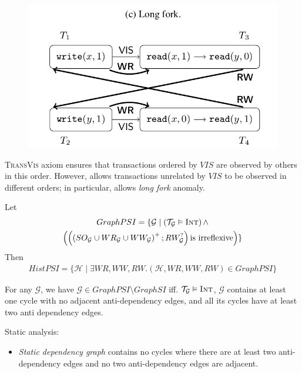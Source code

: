 \documentclass{beamer}
\begin{document}
\begin{frame}
	\begin{figure}
		\includegraphics[scale=0.25]{fig2c}
	\end{figure}
	\begin{definition}
		\textsc{TransVis} axiom ensures that transactions ordered by $VIS$ are observed by others in this order. However, allows transactions unrelated by $VIS$ to be observed in different orders; in particular, allows \textit{long fork} anomaly. \\
	\end{definition}
\end{frame}

\begin{frame}
	\begin{theorem}
	Let
		\begin{multline*}
		GraphPSI = \{ \mathcal{G} \mid \left( \mathcal{T}_\mathcal{G} \vDash \textsc{Int} \right) \wedge \\
			\left(
				\left(
					\left(
					SO_\mathcal{G} \cup WR_\mathcal{G} \cup WW_\mathcal{G}
					\right)^+; RW_\mathcal{G}^?
				\right) \text{is irreflexive}
			\right)
		\}
		\end{multline*}
		Then
		\begin{multline*}
		HistPSI = \{ \mathcal{H} \mid  \exists WR,WW,RW.
		 (\mathcal{H}, WR, WW, RW) \in GraphPSI \}
		\end{multline*}
	\end{theorem}
\end{frame}

\begin{frame}
	\begin{theorem}
		For any $\mathcal{G}$, we have $\mathcal{G} \in GraphPSI \setminus GraphSI $ iff. $\mathcal{T}_\mathcal{G} \vDash \textsc{Int}$, $\mathcal{G}$ contains at least one cycle with no adjacent anti-dependency edges, and all its cycles have at least two anti dependency edges.
	\end{theorem}
	
	Static analysis:
	\begin{itemize}
		\item \textit{Static dependency graph} contains no cycles where there are at least two anti-dependency edges and no two anti-dependency edges are adjacent.
	\end{itemize}
\end{frame}
\end{document}
